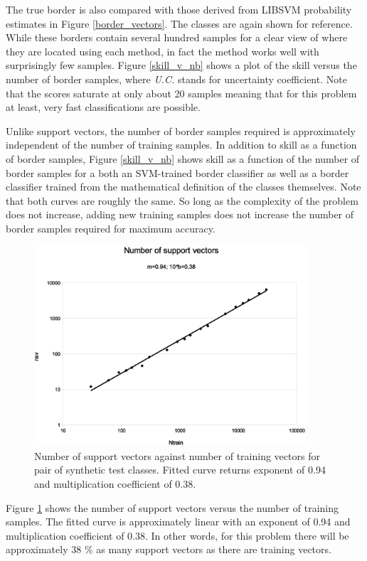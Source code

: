 The true border is also compared with those derived from LIBSVM
probability estimates in Figure \ref{border_vectors}.
The classes are again shown for reference.
While these borders contain several hundred samples for a clear view of where
they are located using each method, in fact the method works well with
surprisingly few samples.  Figure \ref{skill_v_nb} shows a plot of the skill
versus the number of border samples, where {\it U.C.} stands for
uncertainty coefficient. Note that the scores saturate at only about 20
samples meaning that for this problem at least, very fast classifications are
possible.

Unlike support vectors, the number of border samples required is approximately
independent of the number of training samples.
In addition to skill as a function of border samples,
Figure \ref{skill_v_nb} shows skill as a function of the number of border 
samples for a both an SVM-trained border classifier as well as
a border classifier trained from the mathematical definition of the 
classes themselves.
Note that both curves are roughly the same.
So long as the complexity of
the problem does not increase, adding new training samples does not increase
the number of border samples required for maximum accuracy.

\begin{figure}
\includegraphics[width=0.9\textwidth]{../nsv}
\caption{Number of support vectors against number of training vectors for pair of synthetic test classes. Fitted curve returns exponent of 0.94 and multiplication coefficient of 0.38.}
\label{nsv}
\end{figure}

Figure \ref{nsv} shows the number of support vectors versus the
number of training samples. The fitted curve is approximately linear 
with an exponent of 0.94 and multiplication coefficient of 0.38.
In other words, for this problem there will be approximately 38 \% as many 
support vectors as there are training vectors.

